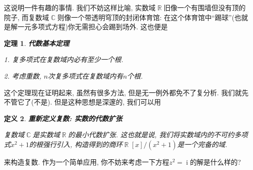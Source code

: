 \documentclass[UTF8]{ctexart}
\newcommand{\<}{\langle}
\renewcommand{\>}{\rangle}
\DeclareMathOperator{\R}{\mathbb{R}}
\DeclareMathOperator{\C}{\mathbb{C}}
\DeclareMathOperator{\ii}{\mathrm{i}}
\newtheorem{thm}{定理}[subsection]
\newtheorem{dfn}[thm]{定义}
\begin{document}
            这说明一件有趣的事情. 我们不妨这样比喻, 实数域$\R$旧像一个有围墙但没有顶的院子, 而复数域$\C$则像一个带透明穹顶的封闭体育馆: 在这个体育馆中``踢球''(也就是解一元多项式方程)你无需担心会踢到场外. 这也便是

            \begin{thm}
                \textbf{代数基本定理}

                1. 复多项式在复数域内必有至少一个根.

                2. 考虑重数, $n$次复多项式在复数域内有$n$个根.
            \end{thm}

            这个定理现在证明起来, 虽然有很多方法, 但是无一例外都免不了复分析. 我们就先不管它了(不是). 但是这种思想是深邃的, 我们可以用

            \begin{dfn}
                \textbf{重新定义复数: 实数的代数扩张}

                复数域$\C$是实数域$\R$的最小代数扩张. 这也就是说, 我们将实数域内的不可约多项式$x^2+1$的根强行引入, 构造得到的商环$\R[x]/(x^2+1)$是一个完备的域.
            \end{dfn}

            来构造复数. 作为一个简单应用, 你不妨来考虑一下方程$z^2=\ii$的解是什么样的?
\end{document}
